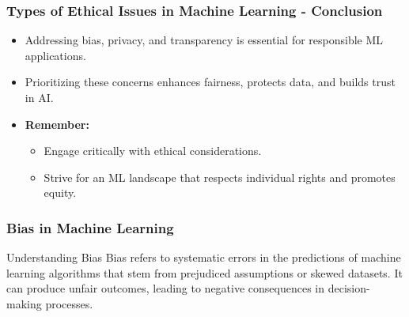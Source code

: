 \documentclass[aspectratio=169]{beamer}
\begin{document}
\begin{frame}[fragile]
    \frametitle{Types of Ethical Issues in Machine Learning - Conclusion}
    \begin{itemize}
        \item Addressing bias, privacy, and transparency is essential for responsible ML applications.
        \item Prioritizing these concerns enhances fairness, protects data, and builds trust in AI.
        \item \textbf{Remember:} 
        \begin{itemize}
            \item Engage critically with ethical considerations.
            \item Strive for an ML landscape that respects individual rights and promotes equity.
        \end{itemize}
    \end{itemize}
\end{frame}

\begin{frame}[fragile]
    \frametitle{Bias in Machine Learning}
    \begin{block}{Understanding Bias}
        Bias refers to systematic errors in the predictions of machine learning algorithms that stem from prejudiced assumptions or skewed datasets.
        It can produce unfair outcomes, leading to negative consequences in decision-making processes.
    \end{block}
\end{frame}
\end{document}
